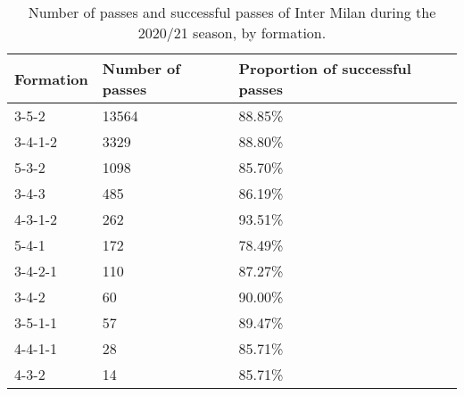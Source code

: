 \begin{table}[!htbp]
\centering
\caption{Number of passes and successful passes of Inter Milan during the 2020/21 season,
by formation.\s
}\s
\begin{tabular}{@{}lll@{}}
\toprule
Formation & Number of passes & Proportion of successful passes \\ \midrule
3-5-2          & 13564       & 88.85\% \\
3-4-1-2        & 3329        & 88.80\% \\
5-3-2          & 1098        & 85.70\% \\
3-4-3          & 485         & 86.19\% \\
4-3-1-2        & 262         & 93.51\% \\
5-4-1          & 172         & 78.49\% \\
3-4-2-1        & 110         & 87.27\% \\
3-4-2          & 60          & 90.00\% \\
3-5-1-1        & 57          & 89.47\% \\
4-4-1-1        & 28          & 85.71\% \\
4-3-2          & 14          & 85.71\% \\ \bottomrule
\end{tabular}

\label{tab:formation_inter}
\end{table}

